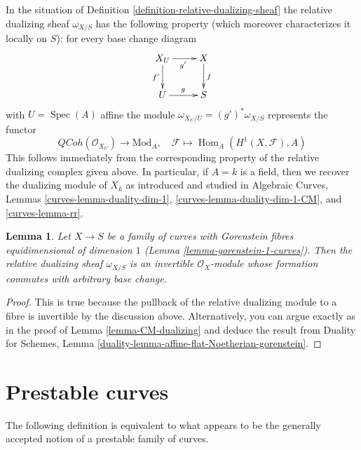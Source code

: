 \documentclass{stacks-project}
\theoremstyle{plain}
\newtheorem{lemma}[subsection]{Lemma}
\theoremstyle{definition}
\theoremstyle{remark}
\numberwithin{equation}{subsection}
\def\Spec{\mathop{\mathrm{Spec}}}
\def\Hom{\mathop{\mathrm{Hom}}\nolimits}
\def\QCoh{\mathit{QCoh}}
\begin{document}
\noindent
In the situation of Definition \ref{definition-relative-dualizing-sheaf}
the relative dualizing sheaf $\omega_{X/S}$ has the following property
(which moreover characterizes it locally on $S$):
for every base change diagram
$$
\xymatrix{
X_U \ar[d]_{f'} \ar[r]_{g'} & X \ar[d]^f \\
U \ar[r]^g & S
}
$$
with $U = \Spec(A)$ affine the module $\omega_{X_U/U} = (g')^*\omega_{X/S}$
represents the functor
$$
\QCoh(\mathcal{O}_{X_U}) \longrightarrow \text{Mod}_A,\quad
\mathcal{F} \longmapsto \Hom_A(H^1(X, \mathcal{F}), A)
$$
This follows immediately from the corresponding property of the relative
dualizing complex given above. In particular, if $A = k$ is a field,
then we recover the dualizing module of $X_k$ as introduced and studied in
Algebraic Curves, Lemmas \ref{curves-lemma-duality-dim-1},
\ref{curves-lemma-duality-dim-1-CM}, and \ref{curves-lemma-rr}.

\begin{lemma}
\label{lemma-gorenstein-dualizing}
Let $X \to S$ be a family of curves with Gorenstein fibres
equidimensional of dimension $1$ (Lemma \ref{lemma-gorenstein-1-curves}).
Then the relative dualizing sheaf $\omega_{X/S}$ is an
invertible $\mathcal{O}_X$-module whose
formation commutes with arbitrary base change.
\end{lemma}

\begin{proof}
This is true because the pullback of the relative dualizing module
to a fibre is invertible by the discussion above. Alternatively, you
can argue exactly as in the proof of
Lemma \ref{lemma-CM-dualizing} and deduce the result from
Duality for Schemes, Lemma
\ref{duality-lemma-affine-flat-Noetherian-gorenstein}.
\end{proof}









\section{Prestable curves}
\label{section-prestable-curves}

\noindent
The following definition is equivalent to what appears to be the
generally accepted notion of a prestable family of curves.
\end{document}

